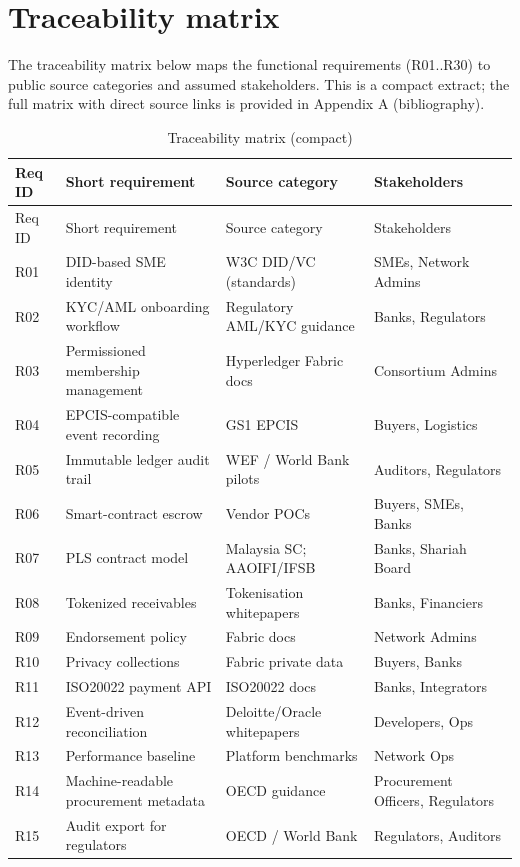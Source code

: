 \documentclass[11pt,a4paper]{article}
\begin{document}
\section{Traceability matrix}
The traceability matrix below maps the functional requirements (R01..R30) to public source categories and assumed stakeholders. This is a compact extract; the full matrix with direct source links is provided in Appendix A (bibliography).

\begin{longtable}{p{} p{} p{} p{}}
\caption{Traceability matrix (compact)}\\
\toprule
Req ID & Short requirement & Source category & Stakeholders \\
\midrule
\endfirsthead
\toprule
Req ID & Short requirement & Source category & Stakeholders \\
\midrule
\endhead
R01 & DID-based SME identity & W3C DID/VC (standards) & SMEs, Network Admins \\
R02 & KYC/AML onboarding workflow & Regulatory AML/KYC guidance & Banks, Regulators \\
R03 & Permissioned membership management & Hyperledger Fabric docs & Consortium Admins \\
R04 & EPCIS-compatible event recording & GS1 EPCIS & Buyers, Logistics \\
R05 & Immutable ledger audit trail & WEF / World Bank pilots & Auditors, Regulators \\
R06 & Smart-contract escrow & Vendor POCs & Buyers, SMEs, Banks \\
R07 & PLS contract model & Malaysia SC; AAOIFI/IFSB & Banks, Shariah Board \\
R08 & Tokenized receivables & Tokenisation whitepapers & Banks, Financiers \\
R09 & Endorsement policy & Fabric docs & Network Admins \\
R10 & Privacy collections & Fabric private data & Buyers, Banks \\
R11 & ISO20022 payment API & ISO20022 docs & Banks, Integrators \\
R12 & Event-driven reconciliation & Deloitte/Oracle whitepapers & Developers, Ops \\
R13 & Performance baseline & Platform benchmarks & Network Ops \\
R14 & Machine-readable procurement metadata & OECD guidance & Procurement Officers, Regulators \\
R15 & Audit export for regulators & OECD / World Bank & Regulators, Auditors \\

\end{longtable}
\end{document}
